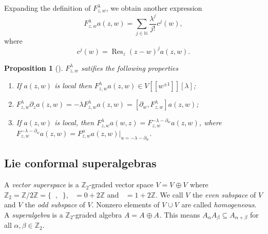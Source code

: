 \documentclass[a4paper, 12pt, reqno]{amsart}
\newtheorem{proposition}[theorem]{Proposition}
\theoremstyle{remark}
\numberwithin{equation}{subsection}
\DeclareMathOperator{\Res}{Res}
\DeclareMathOperator{\zero}{\overline{0}}
\DeclareMathOperator{\one}{\overline{1}}
\begin{document}
Expanding the definition of $F^\lambda_{z, w}$, we obtain another expression
\begin{equation*}
  F^\lambda_{z, w}a(z, w) = \sum_{j \in \mathbb{N}}\frac{\lambda^j}{j!}c^j(w),
\end{equation*}
where
\begin{equation*}
  c^j(w) = \Res_z(z - w)^ja(z, w).
\end{equation*}
\begin{proposition}[{\cite[Proposition 1.5.4]{nozaradan_introduction_2008}}]
  \label{prp:2}
  $F^\lambda_{z, w}$ satifies the following properties
  \begin{enumerate}[label = (\alph*)]
  \item If $a(z, w)$ is local then $F^\lambda_{z, w}a(z, w) \in V[[w^{\pm 1}]][\lambda]$;
  \item $F^\lambda_{z, w}\partial_za(z, w) = -\lambda F^\lambda_{z, w}a(z, w) = [\partial_w, F^{\lambda}_{z, w}]a(z, w)$;
  \item If $a(z, w)$ is local, then $F^\lambda_{z, w}a(w, z) = F^{-\lambda - \partial_w}_{z, w}a(z, w)$, where $F^{-\lambda - \partial_w}_{z, w}a(z, w) = F^\mu_{z, w}a(z, w)|_{u = -\lambda - \partial_w}$.
  \end{enumerate}
\end{proposition}

\subsection{Lie conformal superalgebras}
\label{sec:lie-conf-super}

A \emph{vector superspace} is a $\mathbb{Z}_2$-graded vector space $V = V_{\zero} \oplus V_{\one}$ where $\mathbb{Z}_2 = \mathbb{Z}/2\mathbb{Z} = \{\zero, \one\}$, $\zero = 0 + 2\mathbb{Z}$ and $\one = 1 + 2\mathbb{Z}$.
We call $V_{\zero}$ the \emph{even subspace} of $V$ and $V_{\one}$ the \emph{odd subspace} of $V$.
Nonzero elements of $V_{\zero}\cup V_{\one}$ are called \emph{homogeneous}.
A \emph{superalgebra} is a $\mathbb{Z}_2$-graded algebra $A = A_{\zero} \oplus A_{\one}$.
This means $A_{\alpha}A_{\beta} \subseteq A_{\alpha + \beta}$ for all $\alpha, \beta \in \mathbb{Z}_2$.
\end{document}
